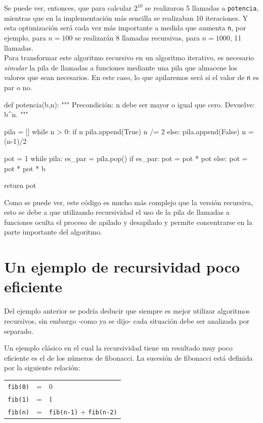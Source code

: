 Se puede ver, entonces, que para calcular $2^{10}$ se realizaron 5 llamadas a
\lstinline!potencia!, mientras que en la implementación más sencilla se
realizaban 10 iteraciones. Y esta optimización será cada vez más importante
a medida que aumenta \lstinline!n!, por ejemplo, para $n = 100$ se
realizarán 8 llamadas recursivas, para $n = 1000$, 11 llamadas. \\


Para transformar este algoritmo recursivo en un algoritmo iterativo, es
necesario {\it simular} la pila de llamadas a funciones mediante una pila que
almacene los valores que sean necesarios.  En este caso, lo que apilaremos será
si el valor de \lstinline!n! es par o no.

\begin{codigo-python-sn}
def potencia(b,n):
    """ Precondición: n debe ser mayor o igual que cero.
        Devuelve: b^n. """

    pila = []
    while n > 0:
        if n %
            pila.append(True)
            n /= 2
        else:
            pila.append(False)
            n = (n-1)/2

    pot = 1
    while pila:
        es_par = pila.pop()
        if es_par:
            pot = pot * pot
        else:
            pot = pot * pot * b

    return pot
\end{codigo-python-sn}

Como se puede ver, este código es mucho más complejo que la versión recursiva,
esto se debe a que utilizando recursividad el uso de la pila de llamadas a
funciones oculta el proceso de apilado y desapilado y permite concentrarse
en la parte importante del algoritmo.

\section{Un ejemplo de recursividad poco eficiente}

Del ejemplo anterior se podría deducir que siempre es mejor utilizar algoritmos
recursivos, sin embargo -como ya se dijo- cada situación debe ser analizada por
separado.

Un ejemplo clásico en el cual la recursividad tiene un resultado muy poco
eficiente es el de los números de fibonacci.  La sucesión de fibonacci está
definida por la siguiente relación:

\begin{tabular}{rcl}
\lstinline!fib(0)! &=& 0 \\
\lstinline!fib(1)! &=& 1 \\
\lstinline!fib(n)! &=& \lstinline!fib(n-1)! + \lstinline!fib(n-2)!
\end{tabular}

